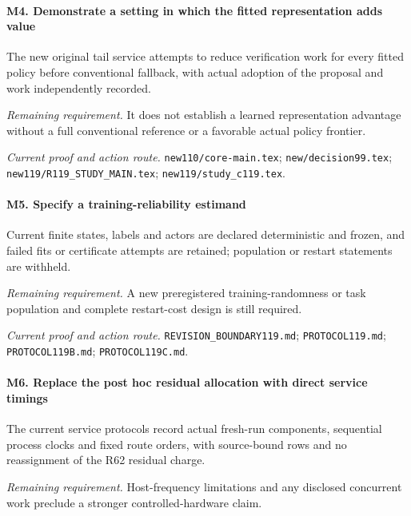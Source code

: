 \paragraph{M4. Demonstrate a setting in which the fitted representation adds value}

The new original tail service attempts to reduce verification work for every fitted policy before conventional fallback, with actual adoption of the proposal and work independently recorded.

\par\emph{Remaining requirement.} It does not establish a learned representation advantage without a full conventional reference or a favorable actual policy frontier.

\par\emph{Current proof and action route.} \nolinkurl{new110/core-main.tex}; \nolinkurl{new/decision99.tex}; \nolinkurl{new119/R119_STUDY_MAIN.tex}; \nolinkurl{new119/study_c119.tex}.

\paragraph{M5. Specify a training-reliability estimand}

Current finite states, labels and actors are declared deterministic and frozen, and failed fits or certificate attempts are retained; population or restart statements are withheld.

\par\emph{Remaining requirement.} A new preregistered training-randomness or task population and complete restart-cost design is still required.

\par\emph{Current proof and action route.} \nolinkurl{REVISION_BOUNDARY119.md}; \nolinkurl{PROTOCOL119.md}; \nolinkurl{PROTOCOL119B.md}; \nolinkurl{PROTOCOL119C.md}.

\paragraph{M6. Replace the post hoc residual allocation with direct service timings}

The current service protocols record actual fresh-run components, sequential process clocks and fixed route orders, with source-bound rows and no reassignment of the R62 residual charge.

\par\emph{Remaining requirement.} Host-frequency limitations and any disclosed concurrent work preclude a stronger controlled-hardware claim.

